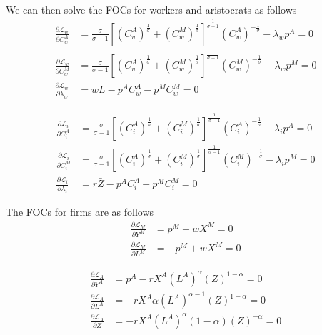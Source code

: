 We can then solve the FOCs for workers and aristocrats as follows
\begin{align}
    \frac{\partial \mathcal{L}_w}{\partial C_w^A} & =\frac{\sigma}{\sigma-1}\left[\left(C_w^A\right)^{\frac{1}{\sigma}}+\left(C_w^M\right)^{\frac{1}{\sigma}}\right]^{\frac{1}{\sigma-1}}\left(C_w^A\right)^{-\frac{1}{\sigma}}-\lambda_w p^A=0 \\
    \frac{\partial \mathcal{L}_w}{\partial C_w^M} & =\frac{\sigma}{\sigma-1}\left[\left(C_w^A\right)^{\frac{1}{\sigma}}+\left(C_w^M\right)^{\frac{1}{\sigma}}\right]^{\frac{1}{\sigma-1}}\left(C_w^M\right)^{-\frac{1}{\sigma}}-\lambda_w p^M=0 \\
    \frac{\partial \mathcal{L}_w}{\partial \lambda_w} & =wL-p^A C_w^A-p^M C_w^M=0
\end{align}

\begin{align}
    \frac{\partial \mathcal{L}_i}{\partial C_i^A} & =\frac{\sigma}{\sigma-1}\left[\left(C_i^A\right)^{\frac{1}{\sigma}}+\left(C_i^M\right)^{\frac{1}{\sigma}}\right]^{\frac{1}{\sigma-1}}\left(C_i^A\right)^{-\frac{1}{\sigma}}-\lambda_i p^A=0 \\
    \frac{\partial \mathcal{L}_i}{\partial C_i^M} & =\frac{\sigma}{\sigma-1}\left[\left(C_i^A\right)^{\frac{1}{\sigma}}+\left(C_i^M\right)^{\frac{1}{\sigma}}\right]^{\frac{1}{\sigma-1}}\left(C_i^M\right)^{-\frac{1}{\sigma}}-\lambda_i p^M=0 \\
    \frac{\partial \mathcal{L}_i}{\partial \lambda_i} & =r\bar{Z}-p^A C_i^A-p^M C_i^M=0
\end{align}

The FOCs for firms are as follows
\begin{align}
    \frac{\partial \mathcal{L}_M}{\partial Y^M} & =p^M-wX^M=0 \\
    \frac{\partial \mathcal{L}_M}{\partial L^M} & =-p^M+wX^M=0
\end{align}

\begin{align}
    \frac{\partial \mathcal{L}_A}{\partial Y^A} & =p^A-rX^A\left(L^A\right)^{\alpha}\left(Z\right)^{1-\alpha}=0 \\
    \frac{\partial \mathcal{L}_A}{\partial L^A} & =-rX^A\alpha\left(L^A\right)^{\alpha-1}\left(Z\right)^{1-\alpha}=0 \\
    \frac{\partial \mathcal{L}_A}{\partial Z} & =-rX^A\left(L^A\right)^{\alpha}\left(1-\alpha\right)\left(Z\right)^{-\alpha}=0
\end{align}

